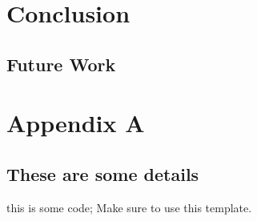 \documentclass[12pt, a4paper]{report}
\newenvironment{code}
{\footnotesize\verbatim}{\endverbatim\normalfont}
\theoremstyle{definition}
\theoremstyle{definition}%
\theoremstyle{definition}%
\theoremstyle{definition}%
\theoremstyle{definition}%
\theoremstyle{definition}%
\begin{document}
\chapter{Conclusion}
\section{Future Work}
\appendix

\chapter{Appendix A}
\section{These are some details}
\begin{code}
this is some code;
Make sure to use this template.
\end{code}


\bibliomatter




 
 
\end{document}
